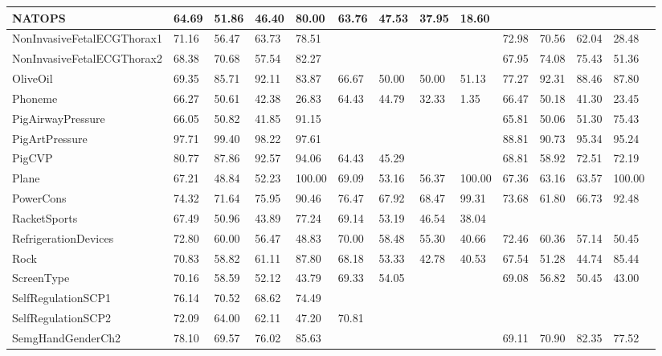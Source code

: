 \begin{landscape}
\begin{longtable}{|l|llll|llll|llll|}
      NATOPS & 64.69 & 51.86 & 46.40 & 80.00 & 63.76 & 47.53 & 37.95 & 18.60 &   &   &   &   \\ \hline
      NonInvasiveFetalECGThorax1 & 71.16 & 56.47 & 63.73 & 78.51 &   &   &   &   & 72.98 & 70.56 & 62.04 & 28.48 \\ \hline
      NonInvasiveFetalECGThorax2 & 68.38 & 70.68 & 57.54 & 82.27 &   &   &   &   & 67.95 & 74.08 & 75.43 & 51.36 \\ \hline
      OliveOil & 69.35 & 85.71 & 92.11 & 83.87 & 66.67 & 50.00 & 50.00 & 51.13 & 77.27 & 92.31 & 88.46 & 87.80 \\ \hline
      Phoneme & 66.27 & 50.61 & 42.38 & 26.83 & 64.43 & 44.79 & 32.33 & 1.35 & 66.47 & 50.18 & 41.30 & 23.45 \\ \hline
      PigAirwayPressure & 66.05 & 50.82 & 41.85 & 91.15 &   &   &   &   & 65.81 & 50.06 & 51.30 & 75.43 \\ \hline
      PigArtPressure & 97.71 & 99.40 & 98.22 & 97.61 &   &   &   &   & 88.81 & 90.73 & 95.34 & 95.24 \\ \hline
      PigCVP & 80.77 & 87.86 & 92.57 & 94.06 & 64.43 & 45.29 &   &   & 68.81 & 58.92 & 72.51 & 72.19 \\ \hline
      Plane & 67.21 & 48.84 & 52.23 & 100.00 & 69.09 & 53.16 & 56.37 & 100.00 & 67.36 & 63.16 & 63.57 & 100.00 \\ \hline
      PowerCons & 74.32 & 71.64 & 75.95 & 90.46 & 76.47 & 67.92 & 68.47 & 99.31 & 73.68 & 61.80 & 66.73 & 92.48 \\ \hline
      RacketSports & 67.49 & 50.96 & 43.89 & 77.24 & 69.14 & 53.19 & 46.54 & 38.04 &   &   &   &   \\ \hline
      RefrigerationDevices & 72.80 & 60.00 & 56.47 & 48.83 & 70.00 & 58.48 & 55.30 & 40.66 & 72.46 & 60.36 & 57.14 & 50.45 \\ \hline
      Rock & 70.83 & 58.82 & 61.11 & 87.80 & 68.18 & 53.33 & 42.78 & 40.53 & 67.54 & 51.28 & 44.74 & 85.44 \\ \hline
      ScreenType & 70.16 & 58.59 & 52.12 & 43.79 & 69.33 & 54.05 &   &   & 69.08 & 56.82 & 50.45 & 43.00 \\ \hline
      SelfRegulationSCP1 & 76.14 & 70.52 & 68.62 & 74.49 &   &   &   &   &   &   &   &   \\ \hline
      SelfRegulationSCP2 & 72.09 & 64.00 & 62.11 & 47.20 & 70.81 &   &   &   &   &   &   &   \\ \hline
      SemgHandGenderCh2 & 78.10 & 69.57 & 76.02 & 85.63 &   &   &   &   & 69.11 & 70.90 & 82.35 & 77.52 \\ \hline

\end{longtable}
\end{landscape}
